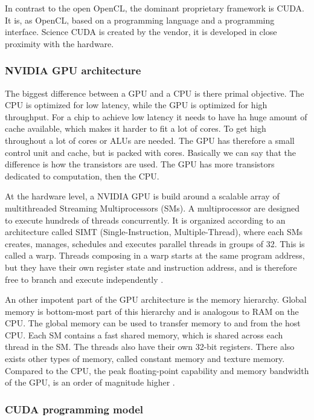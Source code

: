 In contrast to the open OpenCL, the dominant proprietary framework is CUDA. It is, as OpenCL, based on a programming language and a programming interface. Science CUDA is created by the vendor, it is developed in close proximity with the hardware.


\subsubsection{NVIDIA GPU architecture} %
\label{ssub:nvidia_gpu_architecture}


The biggest difference between a GPU and a CPU is there primal objective. The CPU is optimized for low latency, while the GPU is optimized for high throughput. For a chip to achieve low latency it needs to have ha huge amount of cache available, which makes it harder to fit a lot of cores. To get high throughout a lot of cores or ALUs are needed. The GPU has therefore a small control unit and cache, but is packed with cores. Basically we can say that the difference is how the transistors are used. The GPU has more transistors dedicated to computation, then the CPU.

At the hardware level, a NVIDIA GPU is build around a scalable array of multithreaded Streaming Multiprocessors (SMs). A multiprocessor are designed to execute hundreds of threads concurrently. It is organized according to an architecture called SIMT (Single-Instruction, Multiple-Thread), where each SMs creates, manages, schedules and executes parallel threads in groups of 32. This is called a warp. Threads composing in a warp starts at the same program address, but they have their own register state and instruction address, and is therefore free to branch and execute independently \citep{cuda_programming_guide}.

An other impotent part of the GPU architecture is the memory hierarchy. Global memory is bottom-most part of this hierarchy and is analogous to RAM on the CPU. The global memory can be used to transfer memory to and from the host CPU. Each SM contains a fast shared memory, which is shared across each thread in the SM. The threads also have their own 32-bit registers. There also exists other types of memory, called constant memory and texture memory. Compared to the CPU, the peak floating-point capability and memory bandwidth of the GPU, is an order of magnitude higher \citep{LiangcuKnn}.



\subsubsection{CUDA programming model} %
\label{ssub:cuda_programming_model}

